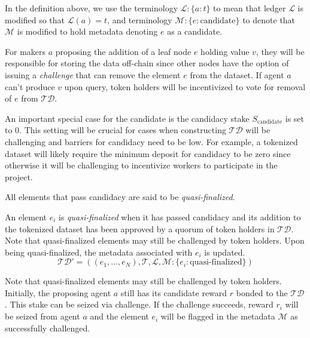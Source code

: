 \documentclass{llncs}
\begin{document}
In the definition above, we use the terminology $\mathcal{L} : \{a: t\}$ to mean that ledger $\mathcal{L}$ is modified so that $\mathcal{L}(a) = t$, and terminology $\mathcal{M} : \{e : \text{candidate}\}$ to denote that $\mathcal{M}$ is modified to hold metadata denoting $e$ as a candidate.

For makers $a$ proposing the addition of a leaf node $e$ holding value $v$, they will be responsible for storing the data off-chain since other nodes have the option of issuing a \textit{challenge} that can remove the element $e$ from the dataset. If agent $a$ can't produce $v$ upon query, token holders will be incentivized to vote for removal of $e$ from $\mathcal{TD}$.

An important special case for the candidate is the candidacy stake $S_\text{candidate}$ is set to $0$. This setting will be crucial for cases when constructing $\mathcal{TD}$ will be challenging and barriers for candidacy need to be low. For example, a tokenized dataset will likely require the minimum deposit for candidacy to be zero since otherwise it will be challenging to incentivize workers to participate in the project.


All elements that pass candidacy are said to be \textit{quasi-finalized}.

\begin{definition}
An element $e_i$ is \textit{quasi-finalized} when it has passed candidacy and its addition to the tokenized dataset has been approved by a quorum of token holders in $\mathcal{TD}$. 
Note that quasi-finalized elements may still be challenged by token holders. Upon being quasi-finalized, the metadata associated with $e_i$ is updated.
\begin{equation*}
\mathcal{TD}' = \left((e_1,\dotsc, e_N), \mathcal{T}, \mathcal{L}, \mathcal{M} : \{e_i: \textrm{quasi-finalized}\}\right )    
\end{equation*}
\end{definition}

Note that quasi-finalized elements may still be challenged by token holders. Initially, the proposing agent $a$ still has its candidate reward $r$ bonded to the $\mathcal{TD}$. This stake can be seized via challenge. If the challenge succeeds, reward $r_i$ will be seized from agent $a$ and the element $e_i$ will be flagged in the metadata $\mathcal{M}$ as successfully challenged.
\end{document}
